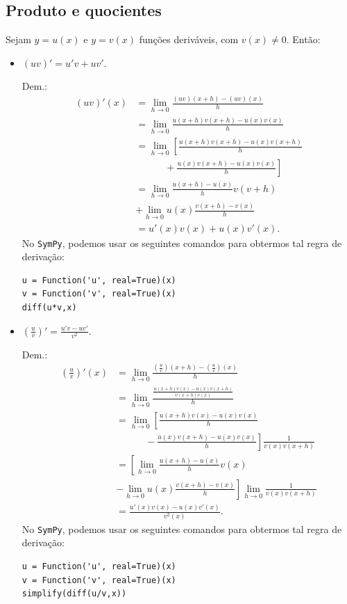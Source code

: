 \subsection{Produto e quocientes}

Sejam $y = u(x)$ e $y = v(x)$ funções deriváveis, com $v(x)\neq 0$. Então:
\begin{itemize}
\item $(uv)' = u'v+uv'$.

  Dem.:
  \begin{align}
    (uv)'(x) &= \lim_{h\to 0} \frac{(uv)(x+h)-(uv)(x)}{h}\\
             &= \lim_{h\to 0} \frac{u(x+h)v(x+h)-u(x)v(x)}{h}\\
             &= \lim_{h\to 0} \left[\frac{u(x+h)v(x+h)-u(x)v(x+h)}{h}\right.\\
             &\qquad\quad+ \left.\frac{u(x)v(x+h)-u(x)v(x)}{h}\right]\\
             &= \lim_{h\to 0} \frac{u(x+h)-u(x)}{h}v(v+h) \\
             &+ \lim_{h\to 0} u(x)\frac{v(x+h)-v(x)}{h}\\
             &= u'(x)v(x) + u(x)v'(x).
  \end{align}
  \ifispython
  No \verb+SymPy+, podemos usar os seguintes comandos para obtermos tal regra de derivação:
\begin{verbatim}
u = Function('u', real=True)(x)
v = Function('v', real=True)(x)
diff(u*v,x)
\end{verbatim}
  \fi
\item $\displaystyle\left(\frac{u}{v}\right)' = \frac{u'v-uv'}{v^2}$.

  Dem.:
  \begin{align}
    \left(\frac{u}{v}\right)'(x) &= \lim_{h\to 0} \frac{\left(\frac{u}{v}\right)(x+h)-\left(\frac{u}{v}\right)(x)}{h} \\
                                 &= \lim_{h\to 0} \frac{\frac{u(x+h)v(x)-u(x)v(x+h)}{v(x+h)v(x)}}{h}\\
                                 &= \lim_{h\to 0} \left[\frac{u(x+h)v(x)-u(x)v(x)}{h}\right. \\
                                 &\qquad\quad - \left.\frac{u(x)v(x+h)-u(x)v(x)}{h}\right]\frac{1}{v(x)v(x+h)}\\
                                 &= \left[\lim_{h\to 0} \frac{u(x+h)-u(x)}{h}v(x)\right. \\
                                 &\left. - \lim_{h\to 0} u(x)\frac{v(x+h)-v(x)}{h}\right]\lim_{h\to 0} \frac{1}{v(x)v(x+h)}\\
                                 &= \frac{u'(x)v(x)-u(x)v'(x)}{v^2(x)}.
  \end{align}
  \ifispython
  No \verb+SymPy+, podemos usar os seguintes comandos para obtermos tal regra de derivação:
\begin{verbatim}
u = Function('u', real=True)(x)
v = Function('v', real=True)(x)
simplify(diff(u/v,x))
\end{verbatim}
  \fi
\end{itemize}

